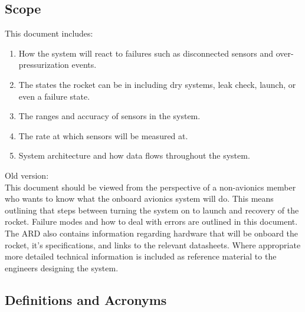 \documentclass{article}
\newcommand{\+}{}
\begin{document}
\subsection{Scope}
This document includes:
\begin{enumerate}
    \item How the system will react to failures such as disconnected sensors and over-pressurization events. 
    \item The states the rocket can be in including dry systems, leak check, launch, or even a failure state.
    \item The ranges and accuracy of sensors in the system.
    \item The rate at which sensors will be measured at.
    \item System architecture and how data flows throughout the system.
\end{enumerate}


Old version:\\
This document should be viewed from the perspective of a non-avionics member who wants to know what the onboard avionics system will do. This means outlining that steps between turning the system on to launch and recovery of the rocket. Failure modes and how to deal with errors are outlined in this document. The ARD also contains information regarding hardware that will be onboard the rocket, it's specifications, and links to the relevant datasheets. Where appropriate more detailed technical information is included as reference material to the engineers designing the system.

\subsection{Definitions and Acronyms}


\newpage

\pagebreak


%


\end{document}
